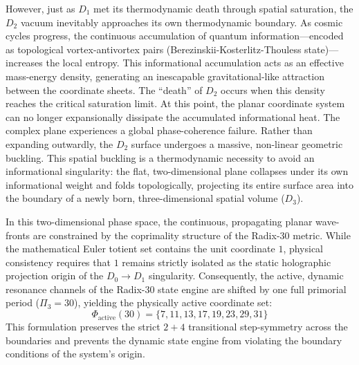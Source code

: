 \documentclass[11pt,a4paper]{article}
\theoremstyle{plain}
\theoremstyle{definition}
\theoremstyle{remark}
\begin{document}
However, just as $D_1$ met its thermodynamic death through spatial saturation, the $D_2$ vacuum inevitably approaches its own thermodynamic boundary. As cosmic cycles progress, the continuous accumulation of quantum information—encoded as topological vortex-antivortex pairs (Berezinskii-Kosterlitz-Thouless state)—increases the local entropy. This informational accumulation acts as an effective mass-energy density, generating an inescapable gravitational-like attraction between the coordinate sheets. The ``death'' of $D_2$ occurs when this density reaches the critical saturation limit. At this point, the planar coordinate system can no longer expansionally dissipate the accumulated informational heat. The complex plane experiences a global phase-coherence failure. Rather than expanding outwardly, the $D_2$ surface undergoes a massive, non-linear geometric buckling. This spatial buckling is a thermodynamic necessity to avoid an informational singularity: the flat, two-dimensional plane collapses under its own informational weight and folds topologically, projecting its entire surface area into the boundary of a newly born, three-dimensional spatial volume ($D_3$).

In this two-dimensional phase space, the continuous, propagating planar wave-fronts are constrained by the coprimality structure of the Radix-30 metric. While the mathematical Euler totient set contains the unit coordinate $1$, physical consistency requires that $1$ remains strictly isolated as the static holographic projection origin of the $D_0 \to D_1$ singularity. Consequently, the active, dynamic resonance channels of the Radix-30 state engine are shifted by one full primorial period ($\Pi_3 = 30$), yielding the physically active coordinate set:
\begin{equation}
\Phi_{\text{active}}(30) = \{7, 11, 13, 17, 19, 23, 29, 31\}
\end{equation}
This formulation preserves the strict $2+4$ transitional step-symmetry across the boundaries and prevents the dynamic state engine from violating the boundary conditions of the system's origin.

\newpage
\end{document}
